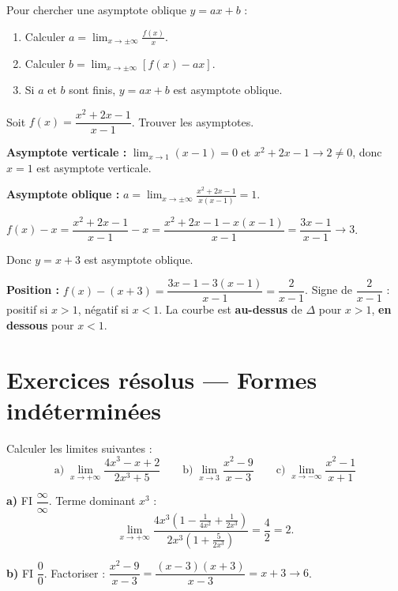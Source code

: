 \begin{methode}
	Pour chercher une asymptote oblique $y=ax+b$ :
	\begin{enumerate}
		\item Calculer $a=\displaystyle\lim_{x\to\pm\infty}\frac{f(x)}{x}$.
		\item Calculer $b=\displaystyle\lim_{x\to\pm\infty}[f(x)-ax]$.
		\item Si $a$ et $b$ sont finis, $y=ax+b$ est asymptote oblique.
	\end{enumerate}
\end{methode}

\begin{exemple}
	Soit $f(x)=\dfrac{x^2+2x-1}{x-1}$. Trouver les asymptotes.
	
	\textbf{Asymptote verticale :}
	$\displaystyle\lim_{x\to 1}(x-1)=0$ et $x^2+2x-1\to 2\neq 0$,
	donc $x=1$ est asymptote verticale.
	
	\textbf{Asymptote oblique :}
	$a=\displaystyle\lim_{x\to\pm\infty}\frac{x^2+2x-1}{x(x-1)}=1$.
	
	$f(x)-x=\dfrac{x^2+2x-1}{x-1}-x=\dfrac{x^2+2x-1-x(x-1)}{x-1}
	=\dfrac{3x-1}{x-1}\to 3$.
	
	Donc $y=x+3$ est asymptote oblique.
	
	\textbf{Position :} $f(x)-(x+3)=\dfrac{3x-1-3(x-1)}{x-1}=\dfrac{2}{x-1}$.
	Signe de $\dfrac{2}{x-1}$ : positif si $x>1$, négatif si $x<1$.
	La courbe est \textbf{au-dessus} de $\Delta$ pour $x>1$,
	\textbf{en dessous} pour $x<1$.
\end{exemple}

\section{Exercices résolus — Formes indéterminées}

\exercice{\etoilepleine\etoilevide\etoilevide}
Calculer les limites suivantes :
\[
\text{a)}\;\lim_{x\to+\infty}\frac{4x^3-x+2}{2x^3+5}
\qquad
\text{b)}\;\lim_{x\to 3}\frac{x^2-9}{x-3}
\qquad
\text{c)}\;\lim_{x\to-\infty}\frac{x^2-1}{x+1}
\]

\solution

\textbf{a)} FI $\dfrac{\infty}{\infty}$. Terme dominant $x^3$ :
\[
\lim_{x\to+\infty}\frac{4x^3(1-\frac{1}{4x^2}+\frac{1}{2x^3})}
{2x^3(1+\frac{5}{2x^3})} = \frac{4}{2} = 2.
\]

\textbf{b)} FI $\dfrac{0}{0}$. Factoriser :
$\dfrac{x^2-9}{x-3}=\dfrac{(x-3)(x+3)}{x-3}=x+3\to 6$.

